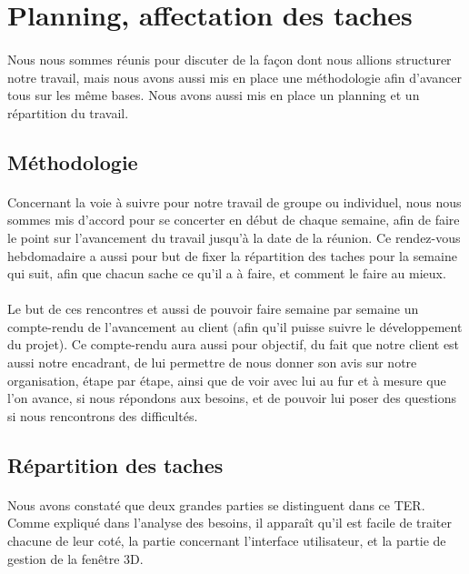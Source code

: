 \section{Planning, affectation des taches}
\paragraph{} Nous nous sommes réunis pour discuter de la façon dont nous allions structurer notre travail, mais nous avons aussi mis en place une méthodologie afin d'avancer tous sur les même bases. Nous avons aussi mis en place un planning et un répartition du travail.
\subsection{Méthodologie}
\paragraph{} Concernant la voie à suivre pour notre travail de groupe ou individuel, nous nous sommes mis d'accord pour se concerter en début de chaque semaine, afin de faire le point sur l'avancement du travail jusqu'à la date de la réunion. Ce rendez-vous hebdomadaire a aussi pour but de fixer la répartition des taches pour la semaine qui suit, afin que chacun sache ce qu'il a à faire, et comment le faire au mieux.

\paragraph{} Le but de ces rencontres et aussi de pouvoir faire semaine par semaine un compte-rendu de l'avancement  au client (afin qu'il puisse suivre le développement du projet). Ce compte-rendu aura aussi pour objectif, du fait que notre client est aussi notre encadrant, de lui permettre de nous donner son avis sur notre organisation, étape par étape, ainsi que de voir avec lui au fur et à mesure que l'on avance, si nous répondons aux besoins, et de pouvoir lui poser des questions si nous rencontrons des difficultés.
\subsection{Répartition des taches} \paragraph{}
Nous avons constaté que deux grandes parties se distinguent dans ce TER. Comme expliqué dans l'analyse des besoins, il apparaît qu'il est facile de traiter chacune de leur coté, la partie concernant l'interface utilisateur, et la partie de gestion de la fenêtre 3D.

